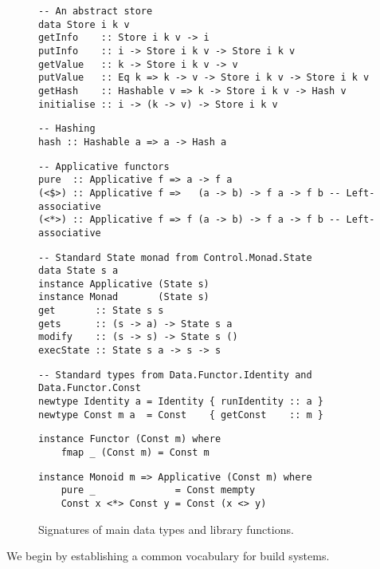 \begin{figure}
\begin{verbatim}
-- An abstract store
data Store i k v
getInfo    :: Store i k v -> i
putInfo    :: i -> Store i k v -> Store i k v
getValue   :: k -> Store i k v -> v
putValue   :: Eq k => k -> v -> Store i k v -> Store i k v
getHash    :: Hashable v => k -> Store i k v -> Hash v
initialise :: i -> (k -> v) -> Store i k v
\end{verbatim}
\vspace{1mm}
\begin{verbatim}
-- Hashing
hash :: Hashable a => a -> Hash a
\end{verbatim}
\vspace{1mm}
\begin{verbatim}
-- Applicative functors
pure  :: Applicative f => a -> f a
(<$>) :: Applicative f =>   (a -> b) -> f a -> f b -- Left-associative
(<*>) :: Applicative f => f (a -> b) -> f a -> f b -- Left-associative
\end{verbatim}
\vspace{1mm}
\begin{verbatim}
-- Standard State monad from Control.Monad.State
data State s a
instance Applicative (State s)
instance Monad       (State s)
get       :: State s s
gets      :: (s -> a) -> State s a
modify    :: (s -> s) -> State s ()
execState :: State s a -> s -> s
\end{verbatim}
\vspace{1mm}
\begin{verbatim}
-- Standard types from Data.Functor.Identity and Data.Functor.Const
newtype Identity a = Identity { runIdentity :: a }
newtype Const m a  = Const    { getConst    :: m }
\end{verbatim}
\vspace{0.5mm}
\begin{verbatim}
instance Functor (Const m) where
    fmap _ (Const m) = Const m
\end{verbatim}
\vspace{0.5mm}
\begin{verbatim}
instance Monoid m => Applicative (Const m) where
    pure _              = Const mempty
    Const x <*> Const y = Const (x <> y)
\end{verbatim}
\vspace{-3mm}
\caption{Signatures of main data types and library functions.}\label{fig-types}
\vspace{-4mm}
\end{figure}
We  begin by establishing a common vocabulary for build systems.

